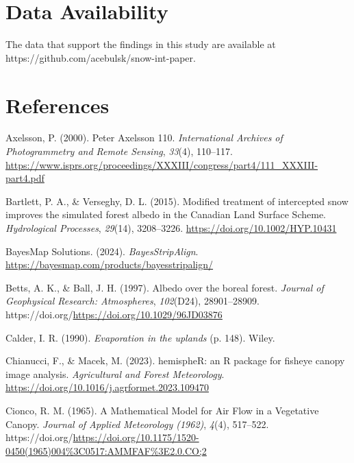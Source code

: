 \documentclass[
  letterpaper,
  DIV=11,
  numbers=noendperiod]{scrartcl}
\newlength{\cslhangindent}
\newenvironment{CSLReferences}[2] %
 {\begin{list}{}{%
  \setlength{\itemindent}{0pt}
  \setlength{\leftmargin}{0pt}
  \setlength{\parsep}{0pt}
  \ifodd #1
   \setlength{\leftmargin}{\cslhangindent}
   \setlength{\itemindent}{-1\cslhangindent}
  \fi
  \setlength{\itemsep}{#2\baselineskip}}}
 {\end{list}}
\begin{document}
\section{Data Availability}\label{data-availability}

The data that support the findings in this study are available at
https://github.com/acebulsk/snow-int-paper.

\pagebreak

\section{References}\label{references}

\label{refs}
\begin{CSLReferences}{1}{0}
Axelsson, P. (2000). {Peter Axelsson 110}. \emph{International Archives
of Photogrammetry and Remote Sensing}, \emph{33}(4), 110--117.
\url{https://www.isprs.org/proceedings/XXXIII/congress/part4/111_XXXIII-part4.pdf}

Bartlett, P. A., \& Verseghy, D. L. (2015). {Modified treatment of
intercepted snow improves the simulated forest albedo in the Canadian
Land Surface Scheme}. \emph{Hydrological Processes}, \emph{29}(14),
3208--3226. \url{https://doi.org/10.1002/HYP.10431}

BayesMap Solutions. (2024). \emph{{BayesStripAlign}}.
\url{https://bayesmap.com/products/bayesstripalign/}

Betts, A. K., \& Ball, J. H. (1997). {Albedo over the boreal forest}.
\emph{Journal of Geophysical Research: Atmospheres}, \emph{102}(D24),
28901--28909. https://doi.org/\url{https://doi.org/10.1029/96JD03876}

Calder, I. R. (1990). \emph{{Evaporation in the uplands}} (p. 148).
Wiley.

Chianucci, F., \& Macek, M. (2023). {hemispheR: an R package for fisheye
canopy image analysis}. \emph{Agricultural and Forest Meteorology}.
\url{https://doi.org/10.1016/j.agrformet.2023.109470}

Cionco, R. M. (1965). {A Mathematical Model for Air Flow in a Vegetative
Canopy}. \emph{Journal of Applied Meteorology (1962)}, \emph{4}(4),
517--522.
https://doi.org/\url{https://doi.org/10.1175/1520-0450(1965)004\%3C0517:AMMFAF\%3E2.0.CO;2}


\end{CSLReferences}
\end{document}
